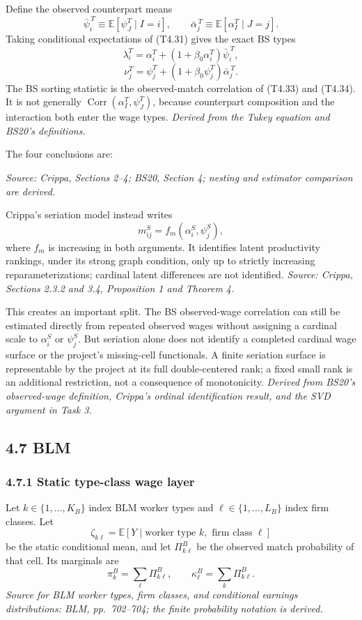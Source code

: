 \documentclass[11pt]{article}
\begin{document}
Define the observed counterpart means
\[
\bar\psi_i^{\,T}
\equiv
\mathbb E[\psi_J^T\mid I=i],
\qquad
\bar\alpha_j^{\,T}
\equiv
\mathbb E[\alpha_I^T\mid J=j].
\tag{T4.32}
\]
Taking conditional expectations of (T4.31) gives the exact BS types
\[
\lambda_i^T
=
\alpha_i^T
+\left(1+\beta_0\alpha_i^T\right)
\bar\psi_i^{\,T},
\tag{T4.33}
\]
\[
\nu_j^T
=
\psi_j^T
+\left(1+\beta_0\psi_j^T\right)
\bar\alpha_j^{\,T}.
\tag{T4.34}
\]
The BS sorting statistic is the observed-match correlation of (T4.33) and
(T4.34).  It is not generally
\(\operatorname{Corr}(\alpha_I^T,\psi_J^T)\), because counterpart composition
and the interaction both enter the wage types.
\textit{Derived from the Tukey equation and BS20's definitions.}

The four conclusions are:

\textit{Source: Crippa, Sections 2--4; BS20, Section 4; nesting and estimator
comparison are derived.}

Crippa's seriation model instead writes
\[
m^S_{ij}=f_m(\alpha_i^S,\psi_j^S),
\tag{T4.35}
\]
where \(f_m\) is increasing in both arguments.  It identifies latent
productivity rankings, under its strong graph condition, only up to strictly
increasing reparameterizations; cardinal latent differences are not
identified.
\textit{Source: Crippa, Sections 2.3.2 and 3.4, Proposition 1 and
Theorem 4.}

This creates an important split.  The BS observed-wage correlation can still
be estimated directly from repeated observed wages without assigning a
cardinal scale to \(\alpha_i^S\) or \(\psi_j^S\).  But seriation alone does not
identify a completed cardinal wage surface or the project's missing-cell
functionals.  A finite seriation surface is representable by the project at
its full double-centered rank; a fixed small rank is an additional
restriction, not a consequence of monotonicity.
\textit{Derived from BS20's observed-wage definition, Crippa's ordinal
identification result, and the SVD argument in Task 3.}

\subsection{4.7 BLM}

\subsubsection{4.7.1 Static type-class wage layer}

Let \(k\in\{1,\ldots,K_B\}\) index BLM worker types and
\(\ell\in\{1,\ldots,L_B\}\) index firm classes.  Let
\[
\zeta_{k\ell}
=
\mathbb E[
Y\mid\text{worker type }k,\text{ firm class }\ell
]
\tag{T4.36}
\]
be the static conditional mean, and let
\(\Pi^B_{k\ell}\) be the observed match probability of that cell.  Its
marginals are
\[
\pi_k^B=\sum_\ell\Pi^B_{k\ell},
\qquad
\kappa_\ell^B=\sum_k\Pi^B_{k\ell}.
\tag{T4.37}
\]
\textit{Source for BLM worker types, firm classes, and conditional earnings
distributions: BLM, pp.\ 702--704; the finite probability notation is
derived.}
\end{document}
